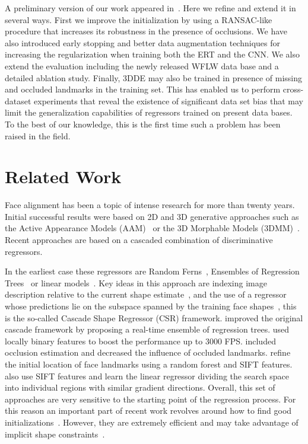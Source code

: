 \documentclass[11pt,twocolumn]{article}
\begin{document}
A preliminary version of our work appeared in~\cite{Valle18}. Here we refine and extend it in several ways. First we improve the initialization by using a RANSAC-like procedure that increases its robustness in the presence of occlusions. We have also introduced early stopping and better data augmentation techniques for increasing the regularization when training both the ERT and the CNN. We also extend the evaluation including the newly released WFLW data base and a detailed ablation study. Finally, 3DDE may also be trained in presence of missing and occluded landmarks in the training set. This has enabled us to perform cross-dataset experiments that reveal the existence of significant data set bias that may limit the generalization capabilities of regressors trained on present data bases. To the best of our knowledge, this is the first time such a problem has been raised in the field.




\section{Related Work}\label{sec:related_work}

Face alignment has been a topic of intense research for more than twenty years. Initial successful results were based on 2D and 3D generative approaches such as the Active Appearance Models (AAM)~\citep{Cootes98} or the 3D Morphable Models (3DMM)~\citep{Blanz03}. Recent approaches are based on a cascaded combination of discriminative regressors. 

In the earliest case these regressors are Random Ferns~\citep{Dollar10}, Ensembles of Regression Trees~\citep{Cao12} or linear models~\citep{Xiong13,Xiong15}. Key ideas in this approach are indexing image description relative to the current shape estimate~\citep{Dollar10}, and the use of a regressor whose predictions lie on the subspace spanned by the training face shapes~\citep{Cao14}, this is the so-called Cascade Shape Regressor (CSR) framework.  \cite{Kazemi14} improved the original cascade framework by proposing a real-time ensemble of regression trees.  \cite{Ren16} used locally binary features to boost the performance up to 3000 FPS. \cite{Burgos13} included occlusion estimation and decreased the influence of occluded landmarks. \cite{Shen14} refine the initial location of face landmarks using a random forest and SIFT features. \cite{Xiong13,Xiong15} also use SIFT features and learn the linear regressor dividing the search space into individual regions with similar gradient directions. Overall, this set of approaches are very sensitive to the starting point of the regression process. For this reason an important part of recent work revolves around how to find good initializations~\citep{Zhu15,Zhu16a}. However, they are extremely efficient and may take advantage of implicit shape constraints~\citep{Cao12,Cao14}.
\end{document}

